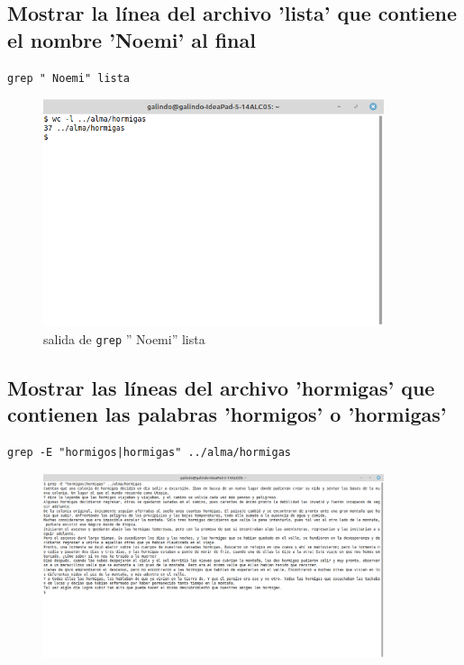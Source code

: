 \documentclass[11pt]{article}
\begin{document}
\pagebreak

\subsection{Mostrar la línea del archivo 'lista' que contiene el nombre 'Noemi' al final}
\label{sec:org795825c}
\begin{verbatim}
grep " Noemi" lista
\end{verbatim}

\begin{figure}[htbp]
\centering
\includegraphics[width=10cm]{img/a30.png}
\caption[\texttt{grep}]{salida de \texttt{grep} '' Noemi'' lista}
\end{figure}

\subsection{Mostrar las líneas del archivo 'hormigas' que contienen las palabras 'hormigos' o 'hormigas'}
\label{sec:org581ed24}
\begin{verbatim}
grep -E "hormigos|hormigas" ../alma/hormigas
\end{verbatim}

\begin{figure}[htbp]
\centering
\includegraphics[width=10cm]{img/a31.png}
\caption{}
\end{figure}
\end{document}
